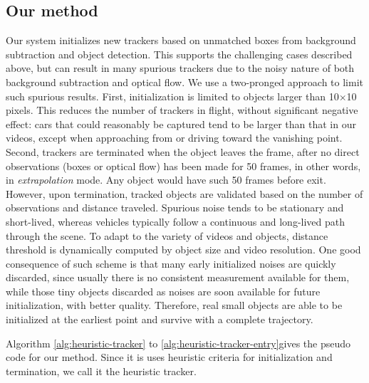 \subsection{Our method}
Our system initializes new trackers based on unmatched boxes from background subtraction and object detection. This supports the challenging cases described above, but can result in many spurious trackers due to the noisy nature of both background subtraction and optical flow. We use a two-pronged approach to limit such spurious results. First, initialization is limited to objects larger than 10$\times$10 pixels. This reduces the number of trackers in flight, without significant negative effect: 
cars that could reasonably be captured tend to be larger than that in our videos, except when approaching from or driving toward the vanishing point. 
Second, trackers are terminated when the object leaves the frame, after no direct observations (boxes or optical flow) has been made for 50 frames, in other words, in \emph{extrapolation} mode. Any object would have such 50 frames before exit. However, upon termination, tracked objects are validated based on the number of observations and distance traveled. Spurious noise tends to be stationary and short-lived, whereas vehicles typically follow a continuous and long-lived path through the scene. To adapt to the variety of videos and objects, distance threshold is dynamically computed by object size and video resolution. 
One good consequence of such scheme is that many early initialized noises are quickly discarded, since usually there is no consistent measurement available for them, while those tiny objects discarded as noises are soon available for future initialization, with better quality. Therefore, real small objects are able to be initialized at the earliest point and survive with a complete trajectory. 

Algorithm \ref{alg:heuristic-tracker} to \ref{alg:heuristic-tracker-entry}gives the pseudo code for our method. Since it is uses heuristic criteria for initialization and termination, we call it the heuristic tracker.


